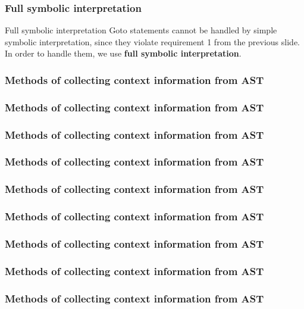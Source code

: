 \documentclass[presentation]{beamer}
\begin{document}
\begin{frame}
  \frametitle{Full symbolic interpretation}
  \begin{block}{Full symbolic interpretation}
  Goto statements cannot be handled by simple symbolic interpretation, since they
violate requirement 1 from the previous slide. In order to handle them, we use \textbf{full symbolic interpretation}. 
  
  \end{block}
  
\end{frame}

\begin{frame}
  \frametitle{Methods of collecting context information from AST}
  
\end{frame}

\begin{frame}
  \frametitle{Methods of collecting context information from AST}
  
\end{frame}

\begin{frame}
  \frametitle{Methods of collecting context information from AST}
  
\end{frame}

\begin{frame}
  \frametitle{Methods of collecting context information from AST}
  
\end{frame}

\begin{frame}
  \frametitle{Methods of collecting context information from AST}
  
\end{frame}

\begin{frame}
  \frametitle{Methods of collecting context information from AST}
  
\end{frame}

\begin{frame}
  \frametitle{Methods of collecting context information from AST}
  
\end{frame}

\begin{frame}
  \frametitle{Methods of collecting context information from AST}
  
\end{frame}

\begin{frame}
  \frametitle{Methods of collecting context information from AST}
  
\end{frame}
\end{document}
